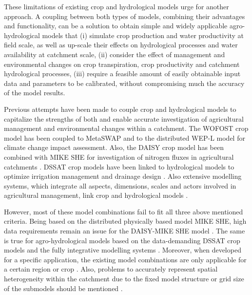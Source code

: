 These limitations of existing crop and hydrological models urge for another approach. A coupling between both types of models, combining their advantages and functionality, can be a solution to obtain simple and widely applicable agro-hydrological models that (i) simulate crop production and water productivity at field scale, as well as up-scale their effects on hydrological processes and water availability at catchment scale, (ii) consider the effect of management and environmental changes on crop transpiration, crop productivity and catchment hydrological processes, (iii) require a feasible amount of easily obtainable input data and parameters to be calibrated, without compromising much the accuracy of the model results.

Previous attempts have been made to couple crop and hydrological models to capitalize the strengths of both and enable accurate investigation of agricultural management and environmental changes within a catchment. The WOFOST crop model \parencite{boogaard2014} has been coupled to MetaSWAP \parencite{vanwalsum2012} and to the distributed WEP-L model \parencite{jia2011} for climate change impact assessment. Also, the DAISY crop model \parencite{abrahamsen2000} has been combined with MIKE SHE for investigation of nitrogen fluxes in agricultural catchments \parencite{styczen1993, thorsen2001}. DSSAT crop models \parencite{jones2003} have been linked to hydrological models to optimize irrigation management and drainage design \parencite{mcnider2014, singh2008}. Also extensive modelling systems, which integrate all aspects, dimensions, scales and actors involved in agricultural management, link crop and hydrological models \parencite{jakeman2003, letcher2006}. 

However, most of these model combinations fail to fit all three above mentioned criteria. Being based on the distributed physically based model MIKE SHE, high data requirements remain an issue for the DAISY-MIKE SHE model \parencite{boegh2004, thorsen2001}. The same is true for agro-hydrological models based on the data-demanding DSSAT crop models \parencite{jones2003} and the fully integrative modelling systems \parencite{jakeman2003}. Moreover, when developed for a specific application, the existing model combinations are only applicable for a certain region or crop \parencite{mcnider2014}. Also, problems to accurately represent spatial heterogeneity within the catchment due to the fixed model structure or grid size of the submodels should be mentioned \parencite{bithell2009, thorsen2001}.

